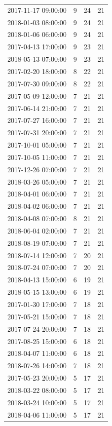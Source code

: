 \begin{tabular}{lrrr}
2017-11-17 09:00:00 & 9 & 24 & 21 \\
2018-01-03 08:00:00 & 9 & 24 & 21 \\
2018-01-06 06:00:00 & 9 & 24 & 21 \\
2017-04-13 17:00:00 & 9 & 23 & 21 \\
2018-05-13 07:00:00 & 9 & 23 & 21 \\
2017-02-20 18:00:00 & 8 & 22 & 21 \\
2017-07-30 09:00:00 & 8 & 22 & 21 \\
2017-05-09 12:00:00 & 7 & 21 & 21 \\
2017-06-14 21:00:00 & 7 & 21 & 21 \\
2017-07-27 16:00:00 & 7 & 21 & 21 \\
2017-07-31 20:00:00 & 7 & 21 & 21 \\
2017-10-01 05:00:00 & 7 & 21 & 21 \\
2017-10-05 11:00:00 & 7 & 21 & 21 \\
2017-12-26 07:00:00 & 7 & 21 & 21 \\
2018-03-26 05:00:00 & 7 & 21 & 21 \\
2018-04-01 06:00:00 & 7 & 21 & 21 \\
2018-04-02 06:00:00 & 7 & 21 & 21 \\
2018-04-08 07:00:00 & 8 & 21 & 21 \\
2018-06-04 02:00:00 & 7 & 21 & 21 \\
2018-08-19 07:00:00 & 7 & 21 & 21 \\
2018-07-14 12:00:00 & 7 & 20 & 21 \\
2018-07-24 07:00:00 & 7 & 20 & 21 \\
2018-04-13 15:00:00 & 6 & 19 & 21 \\
2018-05-15 13:00:00 & 6 & 19 & 21 \\
2017-01-30 17:00:00 & 7 & 18 & 21 \\
2017-05-21 15:00:00 & 7 & 18 & 21 \\
2017-07-24 20:00:00 & 7 & 18 & 21 \\
2017-08-25 15:00:00 & 6 & 18 & 21 \\
2018-04-07 11:00:00 & 6 & 18 & 21 \\
2018-07-26 14:00:00 & 7 & 18 & 21 \\
2017-05-23 20:00:00 & 5 & 17 & 21 \\
2018-03-22 08:00:00 & 5 & 17 & 21 \\
2018-03-24 10:00:00 & 5 & 17 & 21 \\
2018-04-06 11:00:00 & 5 & 17 & 21 \\

\end{tabular}
